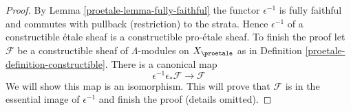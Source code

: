 \begin{proof}

By Lemma \ref{proetale-lemma-fully-faithful} the functor $\epsilon^{-1}$
is fully faithful and commutes with pullback (restriction) to
the strata. Hence $\epsilon^{-1}$ of a constructible \'etale
sheaf is a constructible pro-\'etale sheaf. To finish the
proof let $\mathcal{F}$ be a constructible sheaf of $\Lambda$-modules
on $X_\proetale$ as in Definition \ref{proetale-definition-constructible}.
There is a canonical map
$$
\epsilon^{-1}\epsilon_*\mathcal{F} \longrightarrow \mathcal{F}
$$
We will show this map is an isomorphism. This will prove that
$\mathcal{F}$ is in the essential image of $\epsilon^{-1}$
and finish the proof (details omitted).


\end{proof}
